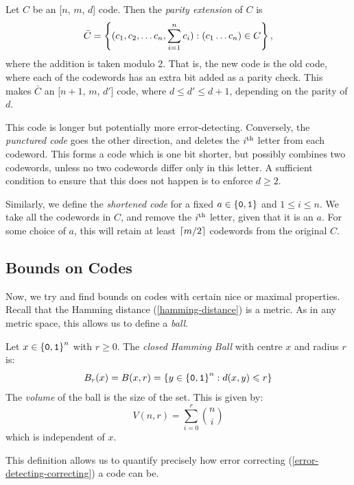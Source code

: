 \documentclass{article}
\begin{document}
\begin{definition}
    Let $C$ be an [$n$, $m$, $d$] code.
    Then the \textit{parity extension} of $C$ is
    \[
	\bar C =
	\left\lbrace (c_1, c_2, \dots c_n, \sum_{i=1}^n c_i) : (c_1 \dots c_n) \in C \right\rbrace,
	\]
	where the addition is taken modulo 2.
	That is, the new code is the old code,
	where each of the codewords has an extra bit added as a parity check.
	This makes $\bar C$ an [$n+1$, $m$, $d'$] code,
	where $d \leq d' \leq d+1$, depending on the parity of $d$.
	
	This code is longer but potentially more error-detecting.
	Conversely, the \textit{punctured code}
	goes the other direction, and deletes the $i^{\text{th}}$ letter from each codeword.
	This forms a code which is one bit shorter,
	but possibly combines two codewords,
	unless no two codewords differ only in this letter.
	A sufficient condition to ensure that this does not happen
	is to enforce $d \geq 2$.
	
	Similarly, we define the \textit{shortened code}
	for a fixed $a \in \left\lbrace \texttt{0}, \texttt{1} \right\rbrace$ and $1 \leq i \leq n$.
	We take all the codewords in $C$, and remove the $i^{\text{th}}$ letter,
	given that it is an $a$. For some choice of $a$,
	this will retain at least $\left\lceil m/2\right\rceil$ codewords from the original $C$.
\end{definition}


\subsection{Bounds on Codes}
\label{section-error-control-bounds}

Now, we try and find bounds on codes with certain nice or maximal properties.
Recall that the Hamming distance (\ref{hamming-distance}) is a metric.
As in any metric space, this allows us to define a \textit{ball}.

\begin{definition}
    Let $x \in \left\lbrace \texttt{0}, \texttt{1} \right\rbrace^n$ with $r \geq 0$.
    The \textit{closed Hamming Ball} with centre $x$ and radius $r$ is:
    \[
	B_r(x) = B(x, r) =
	\left\lbrace y \in \left\lbrace \texttt{0}, \texttt{1} \right\rbrace^n : d(x, y) \leqslant r \right\rbrace
	\]
	The \textit{volume} of the ball is the size of the set.
	This is given by:
	\[
	V(n, r) = \sum_{i=0}^r \binom n i
	\]
	which is independent of $x$.
\end{definition}

This definition allows us to quantify precisely how error correcting
(\ref{error-detecting-correcting})
a code can be.
\end{document}
